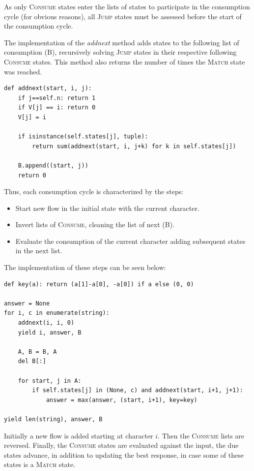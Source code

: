 \documentclass{llncs}
\begin{document}
As only \textsc{Consume} states enter the lists of states to participate in the consumption cycle (for obvious reasons), all  \textsc{Jump} states must be assessed before the start of the consumption cycle. 

The implementation of the \emph{addnext} method adds states to the following list of consumption (B), recursively solving \textsc{Jump} states in their respective following \textsc{Consume} states. This method also returns the number of times the \textsc{Match} state was reached. 

\begin{verbatim}
def addnext(start, i, j):
    if j==self.n: return 1
    if V[j] == i: return 0
    V[j] = i

    if isinstance(self.states[j], tuple):
        return sum(addnext(start, i, j+k) for k in self.states[j])

    B.append((start, j))
    return 0
\end{verbatim}

Thus, each consumption cycle is characterized by the steps: 

\begin{itemize}
    \item Start new flow in the initial state with the current character. 
    \item Invert lists of \textsc{Consume}, cleaning the list of next (B).
    \item Evaluate the consumption of the current character adding subsequent states in the next list. 
\end{itemize}

The implementation of these steps can be seen below: 

\begin{verbatim}
def key(a): return (a[1]-a[0], -a[0]) if a else (0, 0)

answer = None
for i, c in enumerate(string):
    addnext(i, i, 0)
    yield i, answer, B
    
    A, B = B, A
    del B[:]

    for start, j in A:
        if self.states[j] in (None, c) and addnext(start, i+1, j+1):
            answer = max(answer, (start, i+1), key=key)
    
yield len(string), answer, B
\end{verbatim}

Initially a new flow is added starting at character $i$. Then the \textsc{Consume} lists are reversed. Finally, the \textsc{Consume} states are evaluated against the input, the due states advance, in addition to updating the best response, in case some of these states is a \textsc{Match} state. 
\end{document}
